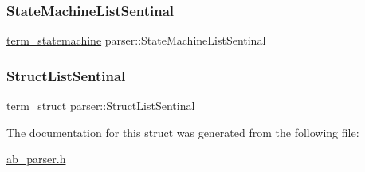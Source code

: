 \mbox{\label{structparser_aa29d6dda9d3d933604823ec27584f162}} 
\subsubsection{\texorpdfstring{State\+Machine\+List\+Sentinal}{StateMachineListSentinal}}
{\footnotesize\ttfamily \hyperlink{structterm__statemachine}{term\+\_\+statemachine} parser\+::\+State\+Machine\+List\+Sentinal}

\mbox{\label{structparser_accfacf760af582468d591a06259406be}} 
\subsubsection{\texorpdfstring{Struct\+List\+Sentinal}{StructListSentinal}}
{\footnotesize\ttfamily \hyperlink{structterm__struct}{term\+\_\+struct} parser\+::\+Struct\+List\+Sentinal}



The documentation for this struct was generated from the following file\+:\begin{DoxyCompactItemize}
\item 
\hyperlink{ab__parser_8h}{ab\+\_\+parser.\+h}\end{DoxyCompactItemize}

